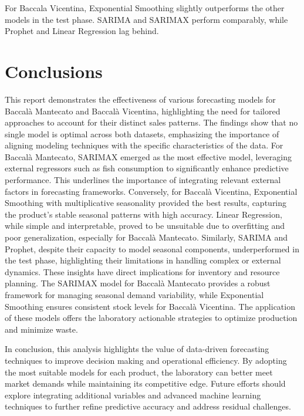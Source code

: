 \documentclass[10pt,twocolumn,letterpaper]{article}
\begin{document}
For Baccala Vicentina, Exponential Smoothing slightly outperforms the other models in the test phase. SARIMA and SARIMAX perform comparably, while Prophet and Linear Regression lag behind.



\section{Conclusions}

This report demonstrates the effectiveness of various forecasting models for Baccalà Mantecato and Baccalà Vicentina, highlighting the need for tailored approaches to account for their distinct sales patterns. The findings show that no single model is optimal across both datasets, emphasizing the importance of aligning modeling techniques with the specific characteristics of the data.
For Baccalà Mantecato, SARIMAX emerged as the most effective model, leveraging external regressors such as fish consumption to significantly enhance predictive performance. This underlines the importance of integrating relevant external factors in forecasting frameworks. Conversely, for Baccalà Vicentina, Exponential Smoothing with multiplicative seasonality provided the best results, capturing the product’s stable seasonal patterns with high accuracy.
Linear Regression, while simple and interpretable, proved to be unsuitable due to overfitting and poor generalization, especially for Baccalà Mantecato. Similarly, SARIMA and Prophet, despite their capacity to model seasonal components, underperformed in the test phase, highlighting their limitations in handling complex or external dynamics.
These insights have direct implications for inventory and resource planning. The SARIMAX model for Baccalà Mantecato provides a robust framework for managing seasonal demand variability, while Exponential Smoothing ensures consistent stock levels for Baccalà Vicentina. The application of these models offers the laboratory actionable strategies to optimize production and minimize waste.

In conclusion, this analysis highlights the value of data-driven forecasting techniques to improve decision making and operational efficiency. By adopting the most suitable models for each product, the laboratory can better meet market demands while maintaining its competitive edge. Future efforts should explore integrating additional variables and advanced machine learning techniques to further refine predictive accuracy and address residual challenges.
\end{document}
